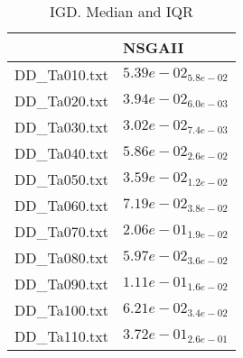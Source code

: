 \documentclass{article}
\begin{document}
\begin{table}
\caption{IGD. Median and IQR}
\label{table:median.IGD}
\begin{scriptsize}
\centering
\begin{tabular}{ll}
\hline &  NSGAII\\
\hline
DD_Ta010.txt & \cellcolor{gray95}$  5.39e-02_{ 5.8e-02}$ \\
DD_Ta020.txt & \cellcolor{gray95}$  3.94e-02_{ 6.0e-03}$ \\
DD_Ta030.txt & \cellcolor{gray95}$  3.02e-02_{ 7.4e-03}$ \\
DD_Ta040.txt & \cellcolor{gray95}$  5.86e-02_{ 2.6e-02}$ \\
DD_Ta050.txt & \cellcolor{gray95}$  3.59e-02_{ 1.2e-02}$ \\
DD_Ta060.txt & \cellcolor{gray95}$  7.19e-02_{ 3.8e-02}$ \\
DD_Ta070.txt & \cellcolor{gray95}$  2.06e-01_{ 1.9e-02}$ \\
DD_Ta080.txt & \cellcolor{gray95}$  5.97e-02_{ 3.6e-02}$ \\
DD_Ta090.txt & \cellcolor{gray95}$  1.11e-01_{ 1.6e-02}$ \\
DD_Ta100.txt & \cellcolor{gray95}$  6.21e-02_{ 3.4e-02}$ \\
DD_Ta110.txt & \cellcolor{gray95}$  3.72e-01_{ 2.6e-01}$ \\
\hline
\end{tabular}
\end{scriptsize}
\end{table}
\end{document}
